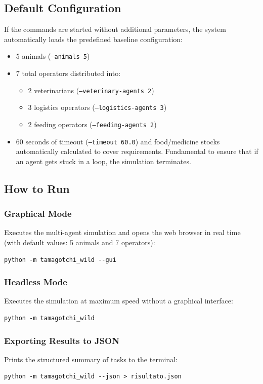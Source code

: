 \documentclass{article}
\renewcommand{\_}{\oldtextunderscore\allowbreak}
\begin{document}
\subsection{Default Configuration}
If the commands are started without additional parameters, the system automatically loads the predefined baseline configuration:
\begin{itemize}
    \item 5 animals (\texttt{--animals 5})
    \item 7 total operators distributed into:
    \begin{itemize}
        \item 2 veterinarians (\texttt{--veterinary-agents 2})
        \item 3 logistics operators (\texttt{--logistics-agents 3})
        \item 2 feeding operators (\texttt{--feeding-agents 2})
    \end{itemize}
    \item 60 seconds of timeout (\texttt{--timeout 60.0}) and food/medicine stocks automatically calculated to cover requirements. Fundamental to ensure that if an agent gets stuck in a loop, the simulation terminates.
\end{itemize}

\subsection{How to Run}

\subsubsection{Graphical Mode}
Executes the multi-agent simulation and opens the web browser in real time (with default values: 5 animals and 7 operators):
\begin{lstlisting}[language={}]
python -m tamagotchi_wild --gui
\end{lstlisting}

\subsubsection{Headless Mode}
Executes the simulation at maximum speed without a graphical interface:
\begin{lstlisting}[language={}]
python -m tamagotchi_wild
\end{lstlisting}

\subsubsection{Exporting Results to JSON}
Prints the structured summary of tasks to the terminal:
\begin{lstlisting}[language={}]
python -m tamagotchi_wild --json > risultato.json
\end{lstlisting}
\end{document}
